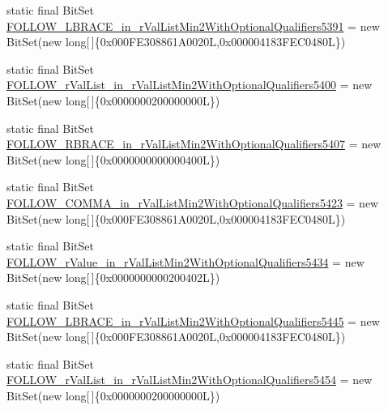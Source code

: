 \begin{DoxyCompactItemize}
\item 
static final Bit\-Set \hyperlink{classorg_1_1tzi_1_1use_1_1parser_1_1testsuite_1_1_test_suite_parser_a78b935c87c1fd478c932c14c1ca28937}{F\-O\-L\-L\-O\-W\-\_\-\-L\-B\-R\-A\-C\-E\-\_\-in\-\_\-r\-Val\-List\-Min2\-With\-Optional\-Qualifiers5391} = new Bit\-Set(new long\mbox{[}$\,$\mbox{]}\{0x000\-F\-E308861\-A0020\-L,0x000004183\-F\-E\-C0480\-L\})
\item 
static final Bit\-Set \hyperlink{classorg_1_1tzi_1_1use_1_1parser_1_1testsuite_1_1_test_suite_parser_ae83137dac7566707ffc70826631762ee}{F\-O\-L\-L\-O\-W\-\_\-r\-Val\-List\-\_\-in\-\_\-r\-Val\-List\-Min2\-With\-Optional\-Qualifiers5400} = new Bit\-Set(new long\mbox{[}$\,$\mbox{]}\{0x0000000200000000\-L\})
\item 
static final Bit\-Set \hyperlink{classorg_1_1tzi_1_1use_1_1parser_1_1testsuite_1_1_test_suite_parser_ac4ee5f3b2558d04e4819ea5c465ddb23}{F\-O\-L\-L\-O\-W\-\_\-\-R\-B\-R\-A\-C\-E\-\_\-in\-\_\-r\-Val\-List\-Min2\-With\-Optional\-Qualifiers5407} = new Bit\-Set(new long\mbox{[}$\,$\mbox{]}\{0x0000000000000400\-L\})
\item 
static final Bit\-Set \hyperlink{classorg_1_1tzi_1_1use_1_1parser_1_1testsuite_1_1_test_suite_parser_af2bc5ab1189c830f6f2b869bea36a68b}{F\-O\-L\-L\-O\-W\-\_\-\-C\-O\-M\-M\-A\-\_\-in\-\_\-r\-Val\-List\-Min2\-With\-Optional\-Qualifiers5423} = new Bit\-Set(new long\mbox{[}$\,$\mbox{]}\{0x000\-F\-E308861\-A0020\-L,0x000004183\-F\-E\-C0480\-L\})
\item 
static final Bit\-Set \hyperlink{classorg_1_1tzi_1_1use_1_1parser_1_1testsuite_1_1_test_suite_parser_acb1eba525bb82090a3aba63606775762}{F\-O\-L\-L\-O\-W\-\_\-r\-Value\-\_\-in\-\_\-r\-Val\-List\-Min2\-With\-Optional\-Qualifiers5434} = new Bit\-Set(new long\mbox{[}$\,$\mbox{]}\{0x0000000000200402\-L\})
\item 
static final Bit\-Set \hyperlink{classorg_1_1tzi_1_1use_1_1parser_1_1testsuite_1_1_test_suite_parser_ab25cd576d7a93c0d66645c87b10dbe55}{F\-O\-L\-L\-O\-W\-\_\-\-L\-B\-R\-A\-C\-E\-\_\-in\-\_\-r\-Val\-List\-Min2\-With\-Optional\-Qualifiers5445} = new Bit\-Set(new long\mbox{[}$\,$\mbox{]}\{0x000\-F\-E308861\-A0020\-L,0x000004183\-F\-E\-C0480\-L\})
\item 
static final Bit\-Set \hyperlink{classorg_1_1tzi_1_1use_1_1parser_1_1testsuite_1_1_test_suite_parser_a2a33af0398d5a29c34034a98b67d5957}{F\-O\-L\-L\-O\-W\-\_\-r\-Val\-List\-\_\-in\-\_\-r\-Val\-List\-Min2\-With\-Optional\-Qualifiers5454} = new Bit\-Set(new long\mbox{[}$\,$\mbox{]}\{0x0000000200000000\-L\})
\item 

\end{DoxyCompactItemize}
